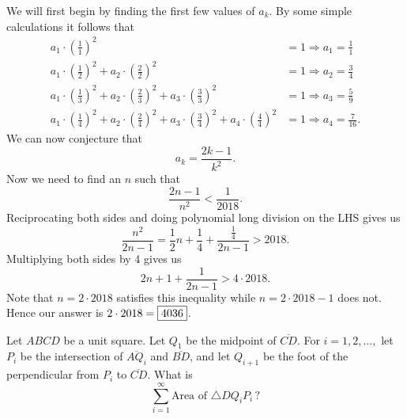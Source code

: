 \documentclass[letterpaper,oneside]{scrartcl}
\begin{document}
\begin{soln}
  We will first begin by finding the first few values of \(a_k\). By some simple calculations it follows that
  \begin{align*}
    a_1\cdot\left(\tfrac{1}{1}\right)^2                                                                                                               & = 1 \Longrightarrow a_1 = \tfrac{1}{1}   \\
    a_1\cdot\left(\tfrac{1}{2}\right)^2+a_2\cdot\left(\tfrac{2}{2}\right)^2                                                                           & = 1 \Longrightarrow a_2 = \tfrac{3}{4}   \\
    a_1\cdot\left(\tfrac{1}{3}\right)^2+a_2\cdot\left(\tfrac{2}{3}\right)^2+a_3\cdot\left(\tfrac{3}{3}\right)^2                                       & = 1 \Longrightarrow a_3 = \tfrac{5}{9}   \\
    a_1\cdot\left(\tfrac{1}{4}\right)^2+a_2\cdot\left(\tfrac{2}{4}\right)^2+a_3\cdot\left(\tfrac{3}{4}\right)^2 + a_4\cdot\left(\tfrac{4}{4}\right)^2 & = 1 \Longrightarrow a_4 = \tfrac{7}{16}.
  \end{align*}
  We can now conjecture that
  \[a_k = \frac{2k-1}{k^2}.\]
  Now we need to find an \(n\) such that
  \[\frac{2n-1}{n^2}<\frac{1}{2018}.\]
  Reciprocating both sides and doing polynomial long division on the LHS gives us
  \[\frac{n^2}{2n-1} = \frac{1}{2}n+\frac{1}{4}+\frac{\tfrac14}{2n-1}>2018.\]
  Multiplying both sides by 4 gives us
  \[2n+1+\frac{1}{2n-1}>4\cdot2018.\]
  Note that \(n=2\cdot2018\) satisfies this inequality while \(n=2\cdot2018-1\) does not. Hence our answer is \(2\cdot2018 = \fbox{4036}\).
\end{soln}
\begin{problem*}
  [2016 AMC 12B \#21]
  Let $ABCD$ be a unit square. Let $Q_1$ be the midpoint of $\overline{CD}$. For $i=1,2,\dots,$ let $P_i$ be the intersection of $\overline{AQ_i}$ and $\overline{BD}$, and let $Q_{i+1}$ be the foot of the perpendicular from $P_i$ to $\overline{CD}$. What is\[\sum_{i=1}^{\infty} \text{Area of } \triangle DQ_i P_i \, ?\]
\end{problem*}
\end{document}
